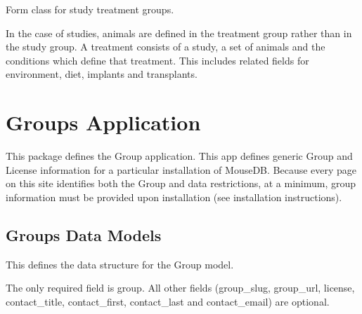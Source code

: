 \documentclass[letterpaper,10pt,english]{sphinxmanual}
\begin{document}

\begin{fulllineitems}
\label{data:mousedb.data.forms.TreatmentForm}
Form class for study treatment groups.

In the case of studies, animals are defined in the treatment group rather than in the study group.  A treatment consists of a study, a set of animals and the conditions which define that treatment.  This includes related fields for environment, diet, implants and transplants.

\end{fulllineitems}



\section{Groups Application}
\label{groups:module-mousedb.groups}\label{groups::doc}\label{groups:groups-application}
This package defines the Group application.
This app defines generic Group and License information for a particular installation of MouseDB.  
Because every page on this site identifies both the Group and data restrictions, at a minimum, group information must be provided upon installation (see installation instructions).


\subsection{Groups Data Models}
\label{groups:groups-data-models}\label{groups:module-mousedb.groups.models}

\begin{fulllineitems}
\label{groups:mousedb.groups.models.Group}
This defines the data structure for the Group model.

The only required field is group.
All other fields (group\_slug, group\_url, license, contact\_title, contact\_first, contact\_last and contact\_email) are optional.

\end{fulllineitems}
\end{document}
